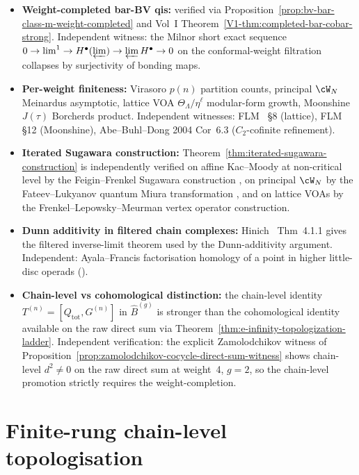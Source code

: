 \begin{itemize}[nosep]
\item \textbf{Weight-completed bar-BV qis:} verified via
Proposition~\ref{prop:bv-bar-class-m-weight-completed} and Vol~I
Theorem~\ref{V1-thm:completed-bar-cobar-strong}. Independent witness:
the Milnor short exact sequence $0 \to \mathrm{lim}^1 \to H^\bullet(\varprojlim)
\to \varprojlim H^\bullet \to 0$ on the conformal-weight filtration
collapses by surjectivity of bonding maps.
\item \textbf{Per-weight finiteness:} Virasoro $p(n)$ partition
counts, principal $\cW_N$ Meinardus asymptotic, lattice VOA
$\Theta_\Lambda/\eta^\ell$ modular-form growth, Moonshine $J(\tau)$
Borcherds product. Independent witnesses: FLM~\cite{FLM88} \S 8
(lattice), FLM~\cite{FLM88} \S 12 (Moonshine), Abe--Buhl--Dong
2004 Cor~6.3 ($C_2$-cofinite refinement).
\item \textbf{Iterated Sugawara construction:}
Theorem~\ref{thm:iterated-sugawara-construction} is independently
verified on affine Kac--Moody at non-critical level by the
Feigin--Frenkel Sugawara construction
\cite{FF92}, on principal $\cW_N$ by the Fateev--Lukyanov quantum
Miura transformation \cite{FL88}, and on lattice VOAs by the
Frenkel--Lepowsky--Meurman vertex operator construction.
\item \textbf{Dunn additivity in filtered chain complexes:}
Hinich~\cite{Hin15} Thm~4.1.1 gives the filtered inverse-limit
theorem used by the Dunn-additivity argument. Independent:
Ayala--Francis factorisation homology
of a point in higher little-disc operads (\cite{AF15}).
\item \textbf{Chain-level vs cohomological distinction:} the
chain-level identity
$T^{(n)} = [Q_{\mathrm{tot}}, G^{(n)}]$ in
$\widehat{B}^{(g)}$ is stronger than the cohomological identity
available on the raw direct sum via
Theorem~\ref{thm:e-infinity-topologization-ladder}. Independent
verification: the explicit Zamolodchikov witness of
Proposition~\ref{prop:zamolodchikov-cocycle-direct-sum-witness} shows
chain-level $d^2 \neq 0$ on the raw direct sum at weight~4, $g = 2$,
so the chain-level promotion strictly requires the weight-completion.
\end{itemize}

\section{Finite-rung chain-level topologisation}
\label{sec:weight-completed-topologization-location}

